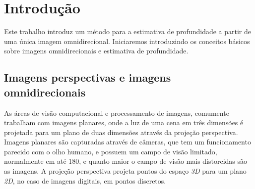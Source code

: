 \documentclass[cic,tc]{iiufrgs}
\begin{document}
\tableofcontents


\chapter{Introdução}

Este trabalho introduz um método para a estimativa de profundidade a partir de uma única imagem omnidirecional. Iniciaremos introduzindo os conceitos básicos sobre imagens omnidirecionais e estimativa de profundidade.

\section{Imagens perspectivas e imagens omnidirecionais}

As áreas de visão computacional e processamento de imagens, comumente trabalham com imagens planares, onde a luz de uma cena em três dimensões é projetada para um plano de duas dimensões através da projeção perspectiva. Imagens planares são capturadas através de câmeras, que tem um funcionamento parecido com o olho humano, e possuem um campo de visão limitado, normalmente em até 180\degree, e quanto maior o campo de visão mais distorcidas são as imagens. A projeção perspectiva projeta pontos do espaço \textit{3D} para um plano \textit{2D}, no caso de imagens digitais, em pontos discretos.
\end{document}
